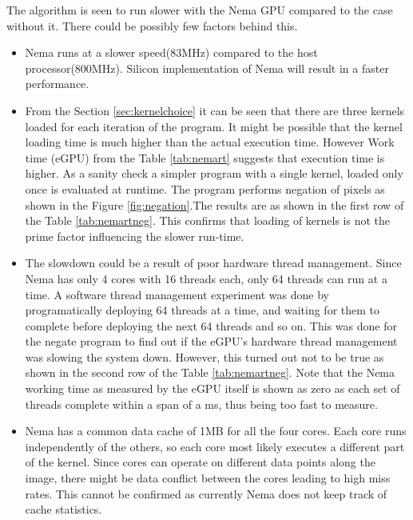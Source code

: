 The algorithm is seen to run slower with the Nema GPU compared to the case without it. There could be possibly few factors behind this. 
\begin{itemize}
\item{Nema runs at a slower speed(83MHz) compared to the host processor(800MHz). Silicon implementation of Nema will result in a faster performance.}
\item{From the Section \ref{sec:kernelchoice} it can be seen that there are three kernels loaded for each iteration of the program. It might be possible that the kernel loading time is much higher than the actual execution time. However Work time (eGPU) from the Table \ref{tab:nemart} suggests that execution time is higher. As a sanity check a simpler program with a single kernel, loaded only once is evaluated at runtime. The program performs negation of pixels as shown in the Figure \ref{fig:negation}.The results are as shown in the first row of the Table \ref{tab:nemartneg}. This confirms that loading of kernels is not the prime factor influencing the slower run-time.}
\item{The slowdown could be a result of poor hardware thread management. Since Nema has only 4 cores with 16 threads each, only 64 threads can run at a time. A software thread management experiment was done by programatically deploying 64 threads at a time, and waiting for them to complete before deploying the next 64 threads and so on. This was done for the negate program to find out if the eGPU's hardware thread management was slowing the system down. However, this turned out not to be true as shown in the second row of the Table \ref{tab:nemartneg}. Note that the Nema working time as measured by the eGPU itself is shown as zero as each set of threads complete within a span of a ms, thus being too fast to measure.}
\item{Nema has a common data cache of 1MB for all the four cores. Each core runs independently of the others, so each core most likely executes a different part of the kernel. Since cores can operate on different data points along the image, there might be data conflict between the cores leading to high miss rates. This cannot be confirmed as currently Nema does not keep track of cache statistics.}

\end{itemize}

